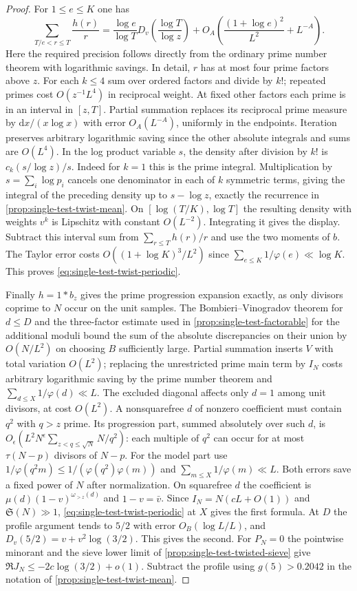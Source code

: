 \documentclass[11pt,a4paper]{article}
\numberwithin{equation}{section}
\newcommand{\SSS}{\mathfrak S}
\newcommand{\ud}{\mathrm d}
\begin{document}
\begin{proof}
For $1\le e\le K$ one has
\[
 \sum_{T/e<r\le T}\frac{h(r)}r
 =\frac{\log e}{\log T}D_v\left(\frac{\log T}{\log z}\right)
   +O_A\left(\frac{(1+\log e)^2}{L^2}+L^{-A}\right).
\]
Here the required precision follows directly from the ordinary
prime number theorem with logarithmic savings. In detail, $r$
has at most four prime factors above $z$. For each $k\le4$ sum
over ordered factors and divide by $k!$; repeated primes cost
$O(z^{-1}L^4)$ in reciprocal weight. At fixed other factors
each prime is in an interval in $[z,T]$. Partial summation replaces
its reciprocal prime measure by $\ud x/(x\log x)$ with error
$O_A(L^{-A})$, uniformly in the endpoints. Iteration preserves
arbitrary logarithmic saving since the other absolute integrals
and sums are $O(L^4)$. In the log product variable $s$, the
density after division by $k!$ is $c_k(s/\log z)/s$.
Indeed for $k=1$ this is the prime integral. Multiplication by
$s=\sum_i\log p_i$ cancels one denominator in each of $k$
symmetric terms, giving the integral of the preceding density
up to $s-\log z$, exactly the recurrence in
\cref{prop:single-test-twist-mean}. On $[\log(T/K),\log T]$
the resulting density with weights $v^k$ is Lipschitz with
constant $O(L^{-2})$. Integrating it gives the display.
Subtract this interval sum from $\sum_{r\le T}h(r)/r$ and use
the two moments of $b$. The Taylor error costs
$O((1+\log K)^3/L^2)$ since $\sum_{e\le K}1/\varphi(e)\ll\log K$.
This proves \eqref{eq:single-test-twist-periodic}.

Finally $h=1*b_z$ gives the prime progression expansion exactly,
as only divisors coprime to $N$ occur on the unit samples.
The Bombieri--Vinogradov theorem for $d\le D$ and the
three-factor estimate used in \cref{prop:single-test-factorable}
for the additional moduli bound the sum of the absolute
discrepancies on their union by $O(N/L^2)$ on choosing $B$
sufficiently large. Partial summation inserts $V$ with total
variation $O(L^2)$; replacing the unrestricted prime main
term by $I_N$ costs arbitrary logarithmic saving by the prime
number theorem and $\sum_{d\le X}1/\varphi(d)\ll L$.
The excluded diagonal affects only $d=1$ among unit divisors,
at cost $O(L^2)$. A nonsquarefree $d$ of nonzero coefficient
must contain $q^2$ with $q>z$ prime. Its progression part,
summed absolutely over such $d$, is
$O_\epsilon(L^2 N^\epsilon\sum_{z<q\le\sqrt N} N/q^2)$:
each multiple of $q^2$ can occur for at most $\tau(N-p)$
divisors of $N-p$. For the model part use
$1/\varphi(q^2 m)\le1/(\varphi(q^2)\varphi(m))$ and
$\sum_{m\le X}1/\varphi(m)\ll L$. Both errors save a fixed
power of $N$ after normalization. On squarefree $d$ the
coefficient is $\mu(d)(1-v)^{\omega_{>z}(d)}$ and $1-v=\bar v$.
Since $I_N=N(cL+O(1))$ and $\SSS(N)\gg1$,
\eqref{eq:single-test-twist-periodic} at $X$ gives the first
formula. At $D$ the profile argument tends to $5/2$ with error
$O_B(\log L/L)$, and $D_v(5/2)=v+v^2\log(3/2)$.
This gives the second. For $P_N=0$ the pointwise minorant and
the sieve lower limit of \cref{prop:single-test-twisted-sieve}
give $\Re J_N\le-2c\log(3/2)+o(1)$.
Subtract the profile using $g(5)>0.2042$ in the notation of
\cref{prop:single-test-twist-mean}.
\end{proof}
\end{document}
